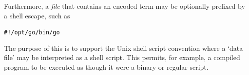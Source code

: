 Furthermore, a \emph{file} that contains an encoded term may be optionally prefixed by a shell escape, such as
\begin{alltt}
#!/opt/go/bin/go
\end{alltt}
The purpose of this is to support the Unix shell script convention where a `data file' may be interpreted as a shell script. This permits, for example, a compiled \go program to be executed as though it were a binary or regular script.

